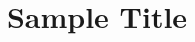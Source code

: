 \documentclass[oneside,american]{amsart}
\numberwithin{equation}{section}
\numberwithin{figure}{section}
\theoremstyle{plain}
\theoremstyle{definition}
\theoremstyle{plain}
\begin{document}
\title{Sample Title}


\date{}

\maketitle
\tableofcontents{}


\end{document}
